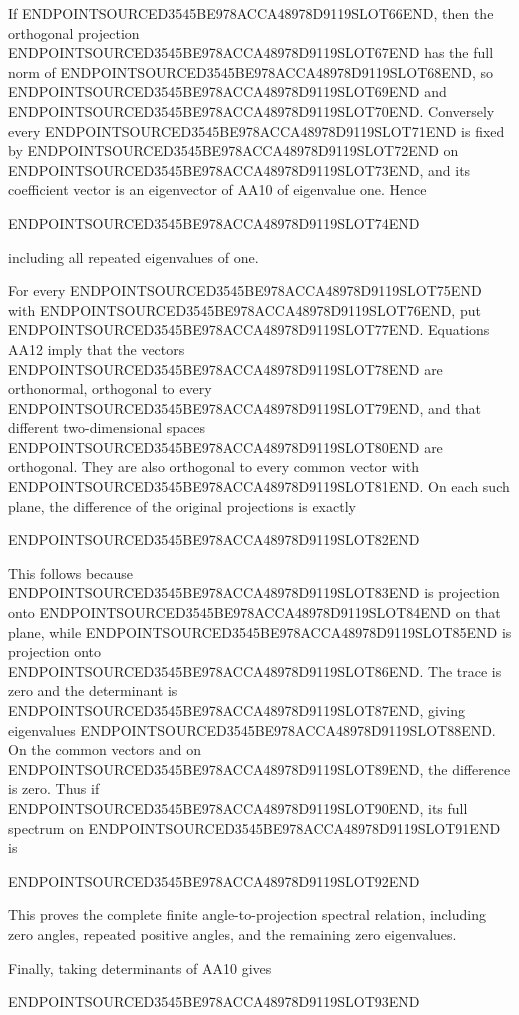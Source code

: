 If ENDPOINTSOURCED3545BE978ACCA48978D9119SLOT66END, then the orthogonal projection ENDPOINTSOURCED3545BE978ACCA48978D9119SLOT67END has the full norm of ENDPOINTSOURCED3545BE978ACCA48978D9119SLOT68END, so ENDPOINTSOURCED3545BE978ACCA48978D9119SLOT69END and ENDPOINTSOURCED3545BE978ACCA48978D9119SLOT70END. Conversely every ENDPOINTSOURCED3545BE978ACCA48978D9119SLOT71END is fixed by ENDPOINTSOURCED3545BE978ACCA48978D9119SLOT72END on ENDPOINTSOURCED3545BE978ACCA48978D9119SLOT73END, and its coefficient vector is an eigenvector of AA10 of eigenvalue one. Hence

ENDPOINTSOURCED3545BE978ACCA48978D9119SLOT74END

including all repeated eigenvalues of one.

For every ENDPOINTSOURCED3545BE978ACCA48978D9119SLOT75END with ENDPOINTSOURCED3545BE978ACCA48978D9119SLOT76END, put ENDPOINTSOURCED3545BE978ACCA48978D9119SLOT77END. Equations AA12 imply that the vectors ENDPOINTSOURCED3545BE978ACCA48978D9119SLOT78END are orthonormal, orthogonal to every ENDPOINTSOURCED3545BE978ACCA48978D9119SLOT79END, and that different two-dimensional spaces ENDPOINTSOURCED3545BE978ACCA48978D9119SLOT80END are orthogonal. They are also orthogonal to every common vector with ENDPOINTSOURCED3545BE978ACCA48978D9119SLOT81END. On each such plane, the difference of the original projections is exactly

ENDPOINTSOURCED3545BE978ACCA48978D9119SLOT82END

This follows because ENDPOINTSOURCED3545BE978ACCA48978D9119SLOT83END is projection onto ENDPOINTSOURCED3545BE978ACCA48978D9119SLOT84END on that plane, while ENDPOINTSOURCED3545BE978ACCA48978D9119SLOT85END is projection onto ENDPOINTSOURCED3545BE978ACCA48978D9119SLOT86END. The trace is zero and the determinant is ENDPOINTSOURCED3545BE978ACCA48978D9119SLOT87END, giving eigenvalues ENDPOINTSOURCED3545BE978ACCA48978D9119SLOT88END. On the common vectors and on ENDPOINTSOURCED3545BE978ACCA48978D9119SLOT89END, the difference is zero. Thus if ENDPOINTSOURCED3545BE978ACCA48978D9119SLOT90END, its full spectrum on ENDPOINTSOURCED3545BE978ACCA48978D9119SLOT91END is

ENDPOINTSOURCED3545BE978ACCA48978D9119SLOT92END

This proves the complete finite angle-to-projection spectral relation, including zero angles, repeated positive angles, and the remaining zero eigenvalues.

Finally, taking determinants of AA10 gives

ENDPOINTSOURCED3545BE978ACCA48978D9119SLOT93END

